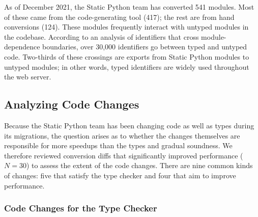 \documentclass[english,cleveref,submission]{programming}
\newcommand{\SP}{Static Python}
\newcommand{\nnum}[1]{$N=#1$}
\begin{document}
As of December 2021, the \SP{} team has converted 541 modules.
Most of these came from the code-generating tool (417); the rest
are from hand conversions (124).
These modules frequently interact with untyped modules in the codebase.
According to an analysis of identifiers that cross module-dependence
boundaries, over 30,000 identifiers go between typed and untyped code.
Two-thirds of these crossings are exports from \SP{} modules
to untyped modules; in other words, typed identifiers are widely used
throughout the web server.



\subsection{Analyzing Code Changes}
\label{s:code-changes}

Because the \SP{} team has been changing code as well as types during its
migrations, the question arises as to whether the changes themselves
are responsible for more speedups than the types and gradual soundness.
We therefore reviewed conversion diffs that significantly improved
performance (\nnum{30}) to assess the extent of the code changes.
There are nine common kinds of changes: five that satisfy the type checker
and four that aim to improve performance.


\subsubsection{Code Changes for the Type Checker}
\label{s:behavior-changes}
\end{document}
